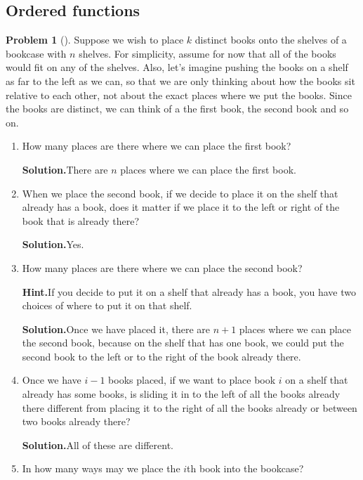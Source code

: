 \documentclass[10pt,]{book}
\theoremstyle{plain}
\theoremstyle{definition}
\newtheorem{activity}[project]{Problem}
\theoremstyle{definition}
\numberwithin{equation}{chapter}
\begin{document}
\subsection[{Ordered functions}]{Ordered functions}\label{orderedfunctionsection}
\begin{activity}[]\label{bookcase}
Suppose we wish to place \(k\) distinct books onto the shelves of a bookcase with \(n\) shelves. For simplicity, assume for now that all of the books would fit on any of the shelves. Also, let's imagine pushing the books on a shelf as far to the left as we can, so that we are only thinking about how the books sit relative to each other, not about the exact places where we put the books. Since the books are distinct, we can think of a the first book, the second book and so on.%
\begin{enumerate}[font=\bfseries,label=(\alph*),ref=\alph*]
\item\label{task-98} How many places are there where we can place the first book?%
\par\medskip\noindent%
\textbf{Solution.}\quad There are \(n\) places where we can place the first book.%
\item\label{task-99} When we place the second book, if we decide to place it on the shelf that already has a book, does it matter if we place it to the left or right of the book that is already there?%
\par\medskip\noindent%
\textbf{Solution.}\quad Yes.%
\item\label{task-100} How many places are there where we can place the second book?%
\par\medskip\noindent%
\textbf{Hint.}\quad If you decide to put it on a shelf that already has a book, you have two choices of where to put it on that shelf.%
\par\medskip\noindent%
\textbf{Solution.}\quad Once we have placed it, there are \(n+1\) places where we can place the second book, because on the shelf that has one book, we could put the second book to the left or to the right of the book already there.%
\item\label{task-101} Once we have \(i-1\) books placed, if we want to place book \(i\)  on a shelf that already has some books, is sliding it in to the left of all the books already there different from placing it to the right of all the books already or between two books already there?%
\par\medskip\noindent%
\textbf{Solution.}\quad All of these are different.%
\item\label{task-102} In how many ways may we place the \(i\)th book into the bookcase?%

\end{enumerate}
\end{activity}
\end{document}
